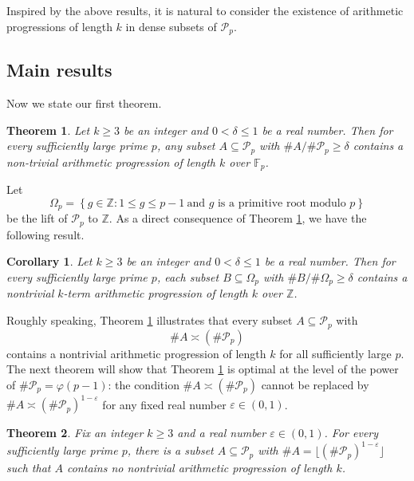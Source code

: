 \documentclass[12pt]{amsart}
\theoremstyle{plain}
\newtheorem{theorem}{Theorem}[section]
\newtheorem{corollary}{Corollary}
\theoremstyle{remark}
\begin{document}
	Inspired by the above results, it is natural to consider the existence of arithmetic progressions of length $k$ in dense subsets of $\mathcal{P}_p$. 
	
	
	
	\subsection{Main results} Now we state our first theorem.
	
	\begin{theorem}\label{Thm. A}
		Let $k\ge3$ be an integer and $0<\delta\le 1$ be a real number. Then for every sufficiently large prime $p$, any subset $A\subseteq\mathcal{P}_p$ with $\#A/\#\mathcal{P}_p\ge \delta$ contains a non-trivial arithmetic progression of length $k$ over $\mathbb{F}_p$. 
	\end{theorem}
	
	Let 
	$$\Omega_p=\left\{g\in\mathbb{Z}: 1\le g\le p-1\ \text{and $g$ is a primitive root modulo $p$}\right\}$$
	be the lift of $\mathcal{P}_p$ to $\mathbb{Z}$. As a direct consequence of Theorem \ref{Thm. A}, we have the following result.
	
	\begin{corollary}\label{Corollary of Thm. A}
		Let $k\ge3$ be an integer and $0<\delta\le 1$ be a real number. Then for every sufficiently large prime $p$, each subset $B\subseteq\Omega_p$ with $\#B/\#\Omega_p\ge\delta$ contains a nontrivial $k$-term arithmetic progression of length $k$ over $\mathbb{Z}$. 
	\end{corollary}
		
		
		
		Roughly speaking, Theorem \ref{Thm. A} illustrates that every
		subset $A\subseteq\mathcal P_p$ with 
		$$\#A\asymp (\#\mathcal{P}_p)$$ 
		contains a nontrivial arithmetic progression of length $k$ for all sufficiently large $p$. The next theorem will show that Theorem \ref{Thm. A} is optimal at the level of the power of $\#\mathcal{P}_p=\varphi(p-1)$:  the condition $\#A\asymp (\#\mathcal{P}_p)$ cannot be replaced by $\#A\asymp (\#\mathcal{P}_p)^{1-\varepsilon}$ for any fixed real number $\varepsilon\in(0,1)$. 
	
	
	\begin{theorem}\label{Thm. B}
		Fix an integer $k\ge3$ and a real number $\varepsilon\in(0,1)$. For every sufficiently large prime $p$, there is a subset $A\subseteq\mathcal{P}_p$ with $\#A=\lfloor (\#\mathcal{P}_p)^{1-\varepsilon}\rfloor$ such that $A$ contains no nontrivial arithmetic progression of length $k$.
	\end{theorem}
	
\end{document}
